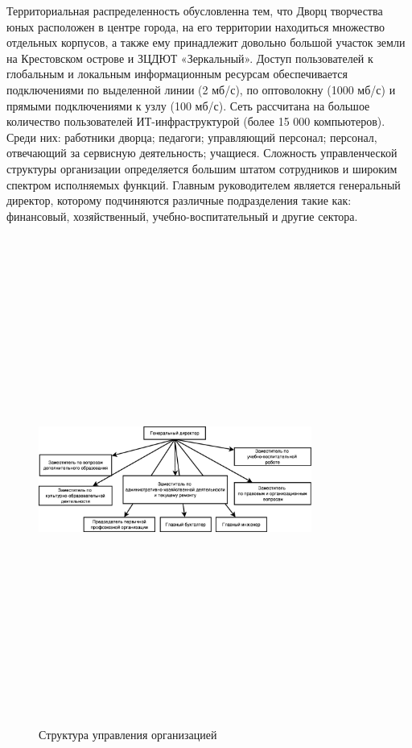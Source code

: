 \documentclass[utf8,usehyperref,12pt]{G7-32}
\begin{document}
Территориальная распределенность обусловленна тем, что Дворц творчества юных расположен в центре города, на его территории находиться множество отдельных корпусов, а также ему принадлежит довольно большой участок земли на Крестовском острове и ЗЦДЮТ «Зеркальный». Доступ пользователей к глобальным и локальным информационным ресурсам обеспечивается подключениями по выделенной линии
(2 мб/с), по оптоволокну (1000 мб/с) и прямыми подключениями к узлу (100 мб/с). Сеть рассчитана на большое количество пользователей ИТ-инфраструктурой (более
15 000 компьютеров). Среди них: работники дворца; педагоги; управляющий персонал;  персонал, отвечающий за сервисную деятельность; учащиеся. Сложность управленческой структуры организации определяется большим штатом сотрудников и широким спектром исполняемых функций. Главным руководителем является генеральный директор, которому подчиняются различные подразделения такие как: финансовый, хозяйственный, учебно-воспитательный и другие сектора.

\begin{figure}[ht]
   \centering%
   \includegraphics[height=160mm, width=0.8\textwidth, clip, keepaspectratio]{pictures/management_structure.eps}
   \caption{Структура управления организацией}\label{fig:fig_management_struct}
 \end{figure}
\end{document}
